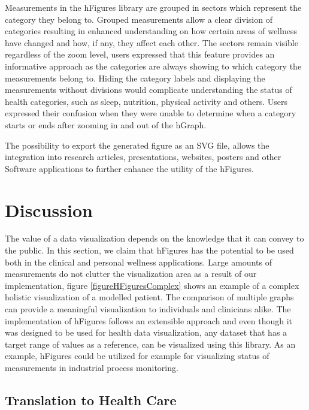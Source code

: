 \documentclass[twocolumn]{bmcart}%
\begin{document}
Measurements in the hFigures library are grouped in sectors which represent the category they belong to. Grouped measurements allow a clear division of categories resulting in enhanced understanding on how certain areas of wellness have changed and how, if any, they affect each other. The sectors remain visible regardless of the zoom level, users expressed that this feature provides an informative approach as the categories are always showing to which category the measurements belong to. Hiding the category labels and displaying the measurements without divisions would complicate understanding the status of health categories, such as sleep, nutrition, physical activity and others. Users expressed their confusion when they were unable to determine when a category starts or ends after zooming in and out of the hGraph.

The possibility to export the generated figure as an SVG file, allows the integration into research articles, presentations, websites, posters and other Software applications to further enhance the utility of the hFigures.

\section*{Discussion}

The value of a data visualization depends on the knowledge that it can convey to the public. In this section, we claim that hFigures has the potential to be used both in the clinical and personal wellness applications. Large amounts of measurements do not clutter the visualization area as a result of our implementation, figure \ref{figureHFiguresComplex} shows an example of a complex holistic visualization of a modelled patient. The comparison of multiple graphs can provide a meaningful visualization to individuals and clinicians alike. The implementation of hFigures follows an extensible approach and even though it was designed to be used for health data visualization, any dataset that has a target range of values as a reference, can be visualized using this library. As an example, hFigures could be utilized for example for visualizing status of measurements in industrial process monitoring. 

\subsection*{Translation to Health Care}
\end{document}
